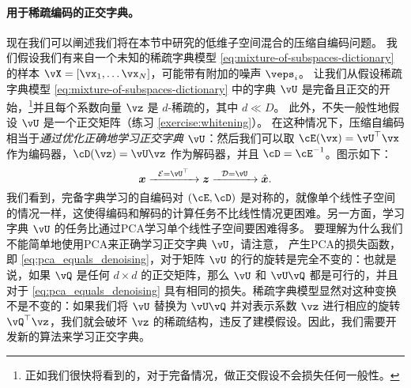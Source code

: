 \documentclass[../../book-main.tex]{subfiles}
\begin{document}

\paragraph{用于稀疏编码的正交字典。}
现在我们可以阐述我们将在本节中研究的低维子空间混合的压缩自编码问题。
我们假设我们有来自一个未知的稀疏字典模型 \eqref{eq:mixture-of-subspaces-dictionary} 的样本 $\vX = [\vx_1, \dots \vx_N]$，可能带有附加的噪声 $\veps_i$。
让我们从假设稀疏字典模型 \eqref{eq:mixture-of-subspaces-dictionary} 中的字典 $\vU$ 是完备且正交的开始，\footnote{正如我们很快将看到的，对于完备情况，做正交假设不会损失任何一般性。}并且每个系数向量 $\vz$ 是 $d$-稀疏的，其中 $d \ll D$。
此外，不失一般性地假设 $\vU$ 是一个正交矩阵（练习 \ref{exercise:whitening}）。
在这种情况下，压缩自编码相当于\textit{通过优化正确地学习正交字典 $\vU$}：然后我们可以取 $\cE(\vx) = \vU^\top \vx$ 作为编码器，$\cD(\vz) = \vU \vz$ 作为解码器，并且 $\cD = \cE^{-1}$。图示如下：
\begin{equation}
\x \xrightarrow{\hspace{2mm} \mathcal{E} = \vU^\top \hspace{2mm}}  \z \xrightarrow{\hspace{2mm} \mathcal{D} = \vU \hspace{2mm}}   \hat{\x}.  
\label{eqn:autoencoding-DL}
\end{equation}    
我们看到，完备字典学习的自编码对 $(\cE, \cD)$ 是对称的，就像单个线性子空间的情况一样，这使得编码和解码的计算任务不比线性情况更困难。另一方面，学习字典 $\vU$ 的任务比通过PCA学习单个线性子空间要困难得多。
要理解为什么我们不能简单地使用PCA来正确学习正交字典 $\vU$，请注意，
产生PCA的损失函数，即 \eqref{eq:pca_equals_denoising}，对于矩阵 $\vU$ 的行的旋转是完全不变的：也就是说，如果 $\vQ$ 是任何 $d \times d$ 的正交矩阵，那么 $\vU$ 和 $\vU \vQ$ 都是可行的，并且对于 \eqref{eq:pca_equals_denoising} 具有相同的损失。稀疏字典模型显然对这种变换不是不变的：如果我们将 $\vU$ 替换为 $\vU \vQ$ 并对表示系数 $\vz$ 进行相应的旋转 $\vQ^\top \vz$，我们就会破坏 $\vz$ 的稀疏结构，违反了建模假设。因此，我们需要开发新的算法来学习正交字典。
\end{document}
